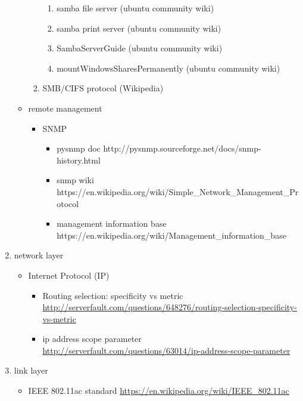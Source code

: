 \documentclass{article}
\begin{document}
\begin{enumerate}
\begin{itemize}
\begin{enumerate}
\begin{enumerate}
                            \item samba file server (ubuntu community wiki)
                            \item samba print server (ubuntu community wiki)
                            \item SambaServerGuide (ubuntu community wiki)
                            \item mountWindowsSharesPermanently (ubuntu community wiki)
                        \end{enumerate}
                    \item SMB/CIFS protocol (Wikipedia)
                \end{enumerate}
            \item remote management
                \begin{itemize}
                    \item SNMP
                        \begin{itemize}
                            \item pysnmp doc http://pysnmp.sourceforge.net/docs/snmp-history.html
                            \item snmp wiki https://en.wikipedia.org/wiki/Simple_Network_Management_Protocol
                            \item management information base https://en.wikipedia.org/wiki/Management_information_base
                        \end{itemize}
                \end{itemize}
        \end{itemize}
    \item network layer
        \begin{itemize}
            \item Internet Protocol (IP)
                \begin{itemize}
                    \item Routing selection: specificity vs metric
                        \url{http://serverfault.com/questions/648276/routing-selection-specificity-vs-metric}
                    \item ip address scope parameter
                        \url{http://serverfault.com/questions/63014/ip-address-scope-parameter}
                \end{itemize}
        \end{itemize}
    \item link layer
        \begin{itemize}
            \item IEEE 802.11ac standard \url{https://en.wikipedia.org/wiki/IEEE_802.11ac}
        \end{itemize}
\end{enumerate}
\end{document}
